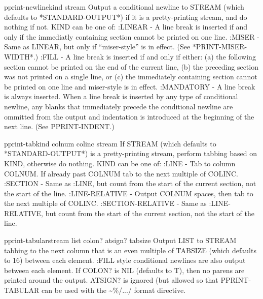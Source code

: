 \begin{function}{pprint-newline}{kind \op stream}{}{}
  Output a conditional newline to STREAM (which defaults to
   *STANDARD-OUTPUT*) if it is a pretty-printing stream, and do
   nothing if not. KIND can be one of:
     :LINEAR - A line break is inserted if and only if the immediatly
        containing section cannot be printed on one line.
     :MISER - Same as LINEAR, but only if ``miser-style'' is in effect.
        (See *PRINT-MISER-WIDTH*.)
     :FILL - A line break is inserted if and only if either:
       (a) the following section cannot be printed on the end of the
           current line,
       (b) the preceding section was not printed on a single line, or
       (c) the immediately containing section cannot be printed on one
           line and miser-style is in effect.
     :MANDATORY - A line break is always inserted.
   When a line break is inserted by any type of conditional newline, any
   blanks that immediately precede the conditional newline are ommitted
   from the output and indentation is introduced at the beginning of the
   next line. (See PPRINT-INDENT.)
\end{function}

\begin{function}{pprint-tab}{kind colnum colinc \op stream}{}{}
  If STREAM (which defaults to *STANDARD-OUTPUT*) is a pretty-printing
   stream, perform tabbing based on KIND, otherwise do nothing. KIND can
   be one of:
     :LINE - Tab to column COLNUM. If already past COLNUM tab to the next
       multiple of COLINC.
     :SECTION - Same as :LINE, but count from the start of the current
       section, not the start of the line.
     :LINE-RELATIVE - Output COLNUM spaces, then tab to the next multiple of
       COLINC.
     :SECTION-RELATIVE - Same as :LINE-RELATIVE, but count from the start
       of the current section, not the start of the line.
\end{function}

\begin{function}{pprint-tabular}{stream list \op colon? atsign? tabsize}{}{}
  Output LIST to STREAM tabbing to the next column that is an even multiple
   of TABSIZE (which defaults to 16) between each element. :FILL style
   conditional newlines are also output between each element. If COLON? is
   NIL (defaults to T), then no parens are printed around the output.
   ATSIGN? is ignored (but allowed so that PPRINT-TABULAR can be used with
   the \~{}\%/.../ format directive.
\end{function}

